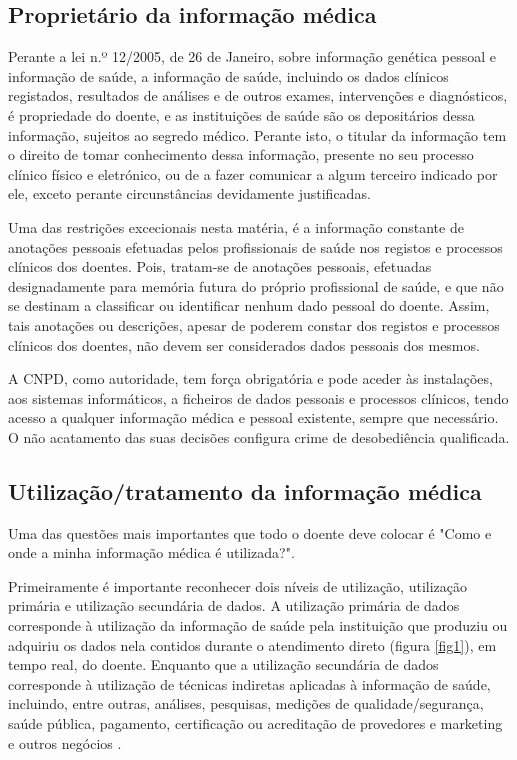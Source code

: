 \documentclass[conference]{IEEEtran}
\begin{document}
\subsection{Proprietário da informação médica}

Perante a lei n.º 12/2005, de 26 de Janeiro, sobre informação genética pessoal e informação de saúde, a informação de saúde, incluindo os dados clínicos registados, resultados de análises e de outros exames, intervenções e diagnósticos, é propriedade do doente, e as instituições de saúde são os depositários dessa informação, sujeitos ao segredo médico. Perante isto, o titular da informação tem o direito de tomar conhecimento dessa informação, presente no seu processo clínico físico e eletrónico, ou de a fazer comunicar a algum terceiro indicado por ele, exceto perante circunstâncias devidamente justificadas.

Uma das restrições excecionais nesta matéria, é a informação constante de anotações pessoais efetuadas pelos profissionais de saúde nos registos e processos clínicos dos doentes.
Pois, tratam-se de anotações pessoais, efetuadas designadamente para memória futura do próprio profissional de saúde, e que não se destinam a classificar ou identificar nenhum dado pessoal do doente.
Assim, tais anotações ou descrições, apesar de poderem constar dos registos e processos clínicos dos doentes, não devem ser considerados dados pessoais dos mesmos.

A CNPD, como autoridade, tem força obrigatória e pode aceder às instalações, aos sistemas informáticos, a ficheiros de dados pessoais e processos clínicos, tendo acesso a qualquer informação médica e pessoal existente, sempre que necessário. O não acatamento das suas decisões configura crime de desobediência qualificada.



\subsection{Utilização/tratamento da informação médica}

Uma das questões mais importantes que todo o doente deve colocar é "Como e onde a minha informação médica é utilizada?".

Primeiramente é importante reconhecer dois níveis de utilização, utilização primária e utilização secundária de dados. A utilização primária de dados corresponde à utilização da informação de saúde pela instituição que produziu ou adquiriu os dados nela contidos durante o atendimento direto (figura \ref{fig1}), em tempo real, do doente. Enquanto que a utilização secundária de dados corresponde à utilização de técnicas indiretas aplicadas à informação de saúde, incluindo, entre outras, análises, pesquisas, medições de qualidade/segurança, saúde pública, pagamento, certificação ou acreditação de provedores e marketing e outros negócios \cite{safran2007toward}.
\end{document}
